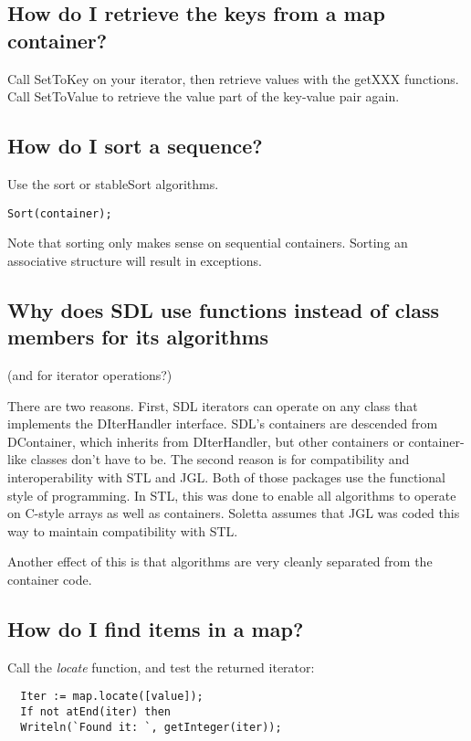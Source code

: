 \documentclass{report}
\begin{document}
\subsection{How do I retrieve the keys from a map container?}

Call SetToKey on your iterator, then retrieve values with the getXXX
functions. Call SetToValue to retrieve the value part of the key-value pair
again.

\subsection{How do I sort a sequence?}

Use the sort or stableSort algorithms.

\lstinline|Sort(container);|

Note that sorting only makes sense on sequential containers. 
Sorting an associative structure will result in exceptions.

\subsection{Why does SDL use functions instead of class members for its algorithms}

(and for iterator operations?)

There are two reasons. First, SDL iterators can operate on any class that
implements the DIterHandler interface. SDL's containers are descended from
DContainer, which inherits from DIterHandler, but other containers or
container-like classes don't have to be. The second reason is for
compatibility and interoperability with STL and JGL. Both of those packages
use the functional style of programming. In STL, this was done to enable all
algorithms to operate on C-style arrays as well as containers.  Soletta
assumes that JGL was coded this way to maintain compatibility with STL.

Another effect of this is that algorithms are very cleanly separated 
from the container code.

\subsection{How do I find items in a map?}

Call the \emph{locate} function, and test the returned iterator:

\begin{lstlisting}
  Iter := map.locate([value]);
  If not atEnd(iter) then
  Writeln(`Found it: `, getInteger(iter));
\end{lstlisting}
\end{document}
